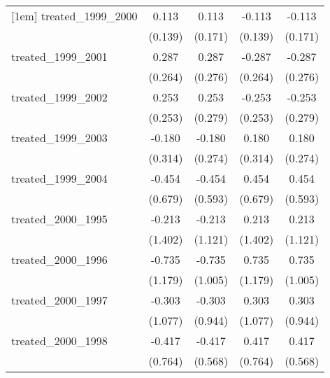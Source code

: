 {\begin{tabular}{l*{4}{c}}
[1em]
treated\_1999\_2000&       0.113         &       0.113         &      -0.113         &      -0.113         \\
            &     (0.139)         &     (0.171)         &     (0.139)         &     (0.171)         \\
[1em]
treated\_1999\_2001&       0.287         &       0.287         &      -0.287         &      -0.287         \\
            &     (0.264)         &     (0.276)         &     (0.264)         &     (0.276)         \\
[1em]
treated\_1999\_2002&       0.253         &       0.253         &      -0.253         &      -0.253         \\
            &     (0.253)         &     (0.279)         &     (0.253)         &     (0.279)         \\
[1em]
treated\_1999\_2003&      -0.180         &      -0.180         &       0.180         &       0.180         \\
            &     (0.314)         &     (0.274)         &     (0.314)         &     (0.274)         \\
[1em]
treated\_1999\_2004&      -0.454         &      -0.454         &       0.454         &       0.454         \\
            &     (0.679)         &     (0.593)         &     (0.679)         &     (0.593)         \\
[1em]
treated\_2000\_1995&      -0.213         &      -0.213         &       0.213         &       0.213         \\
            &     (1.402)         &     (1.121)         &     (1.402)         &     (1.121)         \\
[1em]
treated\_2000\_1996&      -0.735         &      -0.735         &       0.735         &       0.735         \\
            &     (1.179)         &     (1.005)         &     (1.179)         &     (1.005)         \\
[1em]
treated\_2000\_1997&      -0.303         &      -0.303         &       0.303         &       0.303         \\
            &     (1.077)         &     (0.944)         &     (1.077)         &     (0.944)         \\
[1em]
treated\_2000\_1998&      -0.417         &      -0.417         &       0.417         &       0.417         \\
            &     (0.764)         &     (0.568)         &     (0.764)         &     (0.568)         \\

\end{tabular}}
